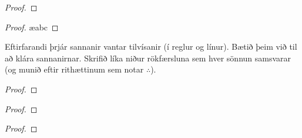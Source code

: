 \begin{multicols}{2}
\begin{proof}
\open
\close
\open
\close
{}
\end{proof}

\begin{proof}
\ae{abc}
\end{proof}
\end{multicols}

\problempart
Eftirfarandi þrjár sannanir vantar tilvísanir (í reglur og línur). Bætið þeim við til að klára sannanirnar. Skrifið líka niður rökfærsluna sem hver sönnun samsvarar (og munið eftir rithættinum sem notar $\therefore$).

\begin{multicols}{2}
\begin{proof}
\end{proof}

\begin{proof}
\open
\close
{}%
\end{proof}

\begin{proof}
\open
\close
\open
\close
{}%
\end{proof}
\end{multicols}

